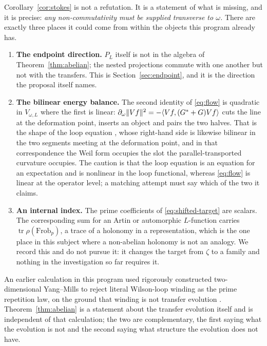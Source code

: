 \begin{remark}
\label{rem:cost}
Corollary~\ref{cor:stokes} is not a refutation. It is a statement of what is
missing, and it is precise: \emph{any non-commutativity must be supplied
transverse to $\omega$.} There are exactly three places it could come from within
the objects this program already has.

\begin{enumerate}
\item \textbf{The endpoint direction.} $P_L$ itself is not in the algebra of
Theorem~\ref{thm:abelian}; the nested projections commute with one another but
not with the transfers. This is Section~\ref{sec:endpoint}, and it is the
direction the proposal itself names.
\item \textbf{The bilinear energy balance.} The second identity of
\eqref{eq:flow} is quadratic in $V_{\omega,L}$ where the first is linear:
$\partial_\omega\lVert V f\rVert^2=-\langle Vf,(G^*+G)Vf\rangle$ cuts the line at the
deformation point, inserts an object and pairs the two halves. That is the shape
of the loop equation \cite{MM}, whose right-hand side is likewise bilinear in the
two segments meeting at the deformation point, and in that correspondence the
Weil form occupies the slot the parallel-transported curvature occupies. The
caution is that the loop equation is an equation for an expectation and is
nonlinear in the loop functional, whereas \eqref{eq:flow} is linear at the
operator level; a matching attempt must say which of the two it claims.
\item \textbf{An internal index.} The prime coefficients of
\eqref{eq:shifted-target} are scalars. The corresponding sum for an Artin or
automorphic $L$-function carries $\operatorname{tr}\rho(\mathrm{Frob}_p)$, a
trace of a holonomy in a representation, which is the one place in this subject
where a non-abelian holonomy is not an analogy. We record this and do not pursue
it: it changes the target from $\zeta$ to a family and nothing in the
investigation so far requires it.
\end{enumerate}
\end{remark}

\begin{remark}
An earlier calculation in this program used rigorously constructed
two-dimensional Yang--Mills \cite{YM2} to reject literal Wilson-loop winding as
the prime repetition law, on the ground that winding is not transfer evolution
\cite{GaugeTransfer}. Theorem~\ref{thm:abelian} is a statement about the
transfer evolution itself and is independent of that calculation; the two are
complementary, the first saying what the evolution is not and the second saying
what structure the evolution does not have.
\end{remark}
